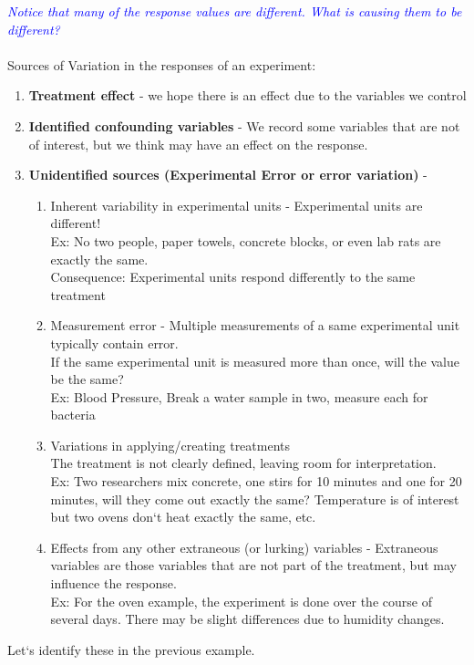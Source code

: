 \noindent\textit{\textcolor{blue}{Notice that many of the response values are different.  What is causing them to be different?}}\\~\\
Sources of Variation in the responses of an experiment:
\begin{enumerate}
\item \textbf{Treatment effect} - we hope there is an effect due to the variables we control
\item \textbf{Identified confounding variables} - We record some variables that are not of interest, but we think may have an effect on the response.
\item \textbf{Unidentified sources (Experimental Error or error variation)} -
		\begin{enumerate}
			\item Inherent variability in experimental units - Experimental units are different! \\
		Ex: No two people, paper towels, concrete blocks, or even lab rats are exactly the same.\\
		Consequence: Experimental units respond differently to the same treatment
			\item Measurement error - Multiple measurements of a same experimental unit typically contain error.\\
			If the same experimental unit is measured more than once, will the value be the same?\\
			Ex: Blood Pressure, Break a water sample in two, measure each for bacteria
			\item Variations in applying/creating treatments\\
		The treatment is not clearly defined, leaving room for interpretation.  \\
			Ex:  Two researchers mix concrete, one stirs for 10 minutes and one for 20 minutes, will they come out exactly the same? Temperature is of interest but two ovens don`t heat exactly the same, etc.
			\item Effects from any other extraneous (or lurking) variables - Extraneous variables are those variables that are not part of the treatment, but may influence the response.\\
			Ex: For the oven example, the experiment is done over the course of several days.  There may be slight differences due to humidity changes.
		\end{enumerate}
\end{enumerate}
Let`s identify these in the previous example.\\

